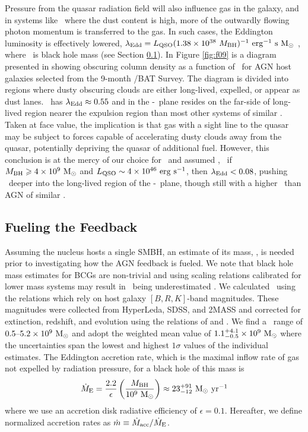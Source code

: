 \documentclass[useAMS,usenatbib]{mn2e}
\begin{document}
Pressure from the quasar radiation field will also influence gas in
the galaxy, and in systems like \irs\ where the dust content is high,
more of the outwardly flowing photon momentum is transferred to the
gas. In such cases, the Eddington luminosity is effectively lowered,
$\lambda_{\rm{Edd}} = L_{\rm{QSO}} (1.38 \times 10^{38} ~M_{\rm{BH}})^{-1} ~\mbox{\ensuremath{\rm{erg}}}^{-1} ~\mbox{\ensuremath{\rm{s}}} ~\rm{M_{\odot}}$
\citep[\eg][]{1993ApJ...402..441L}, where \mbh\ is black hole mass
(see Section \ref{sec:fuel}). In Figure \ref{fig:f09} is a diagram
presented in \citet{2009MNRAS.394L..89F} showing obscuring column
density as a function of \leff\ for AGN host galaxies selected from
the 9-month \swift/BAT Survey. The diagram is divided into regions
where dusty obscuring clouds are either long-lived, expelled, or
appear as dust lanes. \irs\ has $\lambda_{\rm{Edd}} \approx 0.55$ and in the
\nhobs-\leff\ plane resides on the far-side of long-lived region
nearer the expulsion region than most other systems of similar \nhobs.
Taken at face value, the implication is that gas with a sight line to
the quasar may be subject to forces capable of accelerating dusty
clouds away from the quasar, potentially depriving the quasar of
additional fuel. However, this conclusion is at the mercy of our
choice for \mbh\ and assumed \lqso, \ie\ if $M_{\rm{BH}} \geqslant 4 \times 10^9
~\rm{M_{\odot}}$ and $L_{\rm{QSO}} \sim 4 \times 10^{46} ~\rm{\mbox{\ensuremath{\rm{erg}}}~\ensuremath{\rm{\mbox{\ensuremath{\rm{s}}}^{-1}}}}$, then $\lambda_{\rm{Edd}} < 0.08$,
pushing \irs\ deeper into the long-lived region of the
\nhobs-\leff\ plane, though still with a higher \leff\ than AGN of
similar \nhobs.

\subsection{Fueling the Feedback}
\label{sec:fuel}

Assuming the nucleus hosts a single SMBH, an estimate of its mass,
\mbh, is needed prior to investigating how the AGN feedback is
fueled. We note that black hole mass estimates for BCGs are
non-trivial and using scaling relations calibrated for lower mass
systems may result in \mbh\ being underestimated
\citep[\eg][]{2007ApJ...662..808L, 2009ApJ...690..537D}. We calculated
\mbh\ using the \citet{2007MNRAS.379..711G} relations which rely on
host galaxy $[B,R,K]$-band magnitudes. These magnitudes were collected
from HyperLeda, SDSS, and 2MASS and corrected for extinction,
redshift, and evolution using the relations of \citet{cardelli89} and
\citet{poggianti97}. We find a \mbh\ range of $0.5 \mbox{--} 5.2 \times
10^9 ~\rm{M_{\odot}}$ and adopt the weighted mean value of $1.1^{+4.1}_{-0.5}
\times 10^9 ~\rm{M_{\odot}}$ where the uncertainties span the lowest and
highest $1\sigma$ values of the individual estimates. The Eddington
accretion rate, which is the maximal inflow rate of gas not expelled
by radiation pressure, for a black hole of this mass is
\begin{equation}
  \dot{M}_{\rm{E}} = \frac{2.2}{\epsilon} \left(\frac{M_{\rm{BH}}}{10^9~\rm{M_{\odot}}}\right)
  \approx 23^{+91}_{-12} ~\mbox{\ensuremath{\rm{M_{\odot}}~\rm{\mbox{\ensuremath{\rm{yr}}}^{-1}}}}
\end{equation}
where we use an accretion disk radiative efficiency of $\epsilon =
0.1$. Hereafter, we define normalized accretion rates as $\dot{m}
\equiv \dot{M}_{\rm{acc}}/\dot{M}_{\rm{E}}$.
\end{document}
